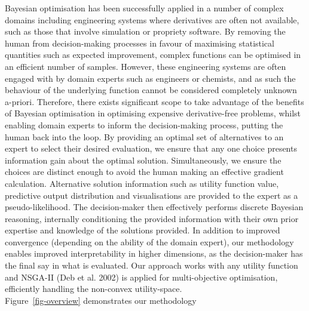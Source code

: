 \documentclass[
  letterpaper,
  DIV=11,
  numbers=noendperiod,
  oneside]{scrartcl}
\begin{document}
Bayesian optimisation has been successfully applied in a number of
complex domains including engineering systems where derivatives are
often not available, such as those that involve simulation or propriety
software. By removing the human from decision-making processes in favour
of maximising statistical quantities such as expected improvement,
complex functions can be optimised in an efficient number of samples.
However, these engineering systems are often engaged with by domain
experts such as engineers or chemists, and as such the behaviour of the
underlying function cannot be considered completely unknown a-priori.
Therefore, there exists significant scope to take advantage of the
benefits of Bayesian optimisation in optimising expensive
derivative-free problems, whilst enabling domain experts to inform the
decision-making process, putting the human back into the loop. By
providing an optimal set of alternatives to an expert to select their
desired evaluation, we ensure that any one choice presents information
gain about the optimal solution. Simultaneously, we ensure the choices
are distinct enough to avoid the human making an effective gradient
calculation. Alternative solution information such as utility function
value, predictive output distribution and visualisations are provided to
the expert as a pseudo-likelihood. The decision-maker then effectively
performs discrete Bayesian reasoning, internally conditioning the
provided information with their own prior expertise and knowledge of the
solutions provided. In addition to improved convergence (depending on
the ability of the domain expert), our methodology enables improved
interpretability in higher dimensions, as the decision-maker has the
final say in what is evaluated. Our approach works with any utility
function and NSGA-II (Deb et al.
2002)
is applied for multi-objective optimisation, efficiently handling the
non-convex utility-space.\\
Figure~\ref{fig-overview} demonstrates our methodology
\end{document}

